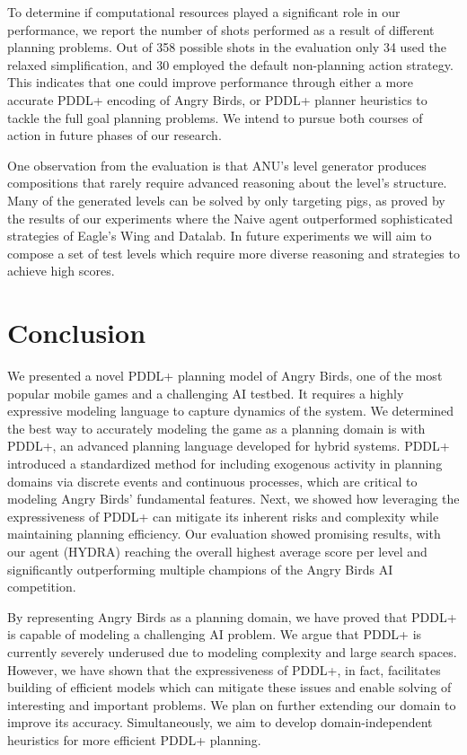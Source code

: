To determine if computational resources played a significant role in our performance, we report the number of shots performed as a result of different planning problems. Out of 358 possible shots in the evaluation only 34 used the relaxed simplification, and 30 employed the default non-planning action strategy. This indicates that one could improve performance through either a more accurate PDDL+ encoding of Angry Birds, or PDDL+ planner heuristics to tackle the full goal planning problems. We intend to pursue both courses of action in future phases of our research.

One observation from the evaluation is that ANU's level generator produces compositions that rarely require advanced reasoning about the level's structure. Many of the generated levels can be  solved by only targeting pigs, as proved by the results of our experiments where the Naive agent outperformed sophisticated strategies of Eagle's Wing and Datalab. In future experiments we will aim to compose a set of test levels which require more diverse reasoning and strategies to achieve high scores.

\section{Conclusion}

We presented a novel PDDL+ planning model of Angry Birds, one of the most popular mobile games and a challenging AI testbed. It requires a highly expressive modeling language to capture  dynamics of the system. We determined the best way to accurately modeling the game as a planning domain is with PDDL+, an advanced planning language developed for hybrid systems. PDDL+ introduced a standardized method for including exogenous activity in planning domains via discrete events and continuous processes, which are critical to modeling Angry Birds' fundamental features. Next, we showed how leveraging the expressiveness of PDDL+ can mitigate its inherent risks and complexity while maintaining planning efficiency. Our evaluation showed promising results, with our agent (HYDRA) reaching the overall highest average score per level and significantly outperforming multiple champions of the Angry Birds AI competition. 

By representing Angry Birds as a planning domain, we have proved that PDDL+ is capable of modeling a challenging AI problem. We argue that PDDL+ is currently severely underused due to modeling complexity and large search spaces. However, we have shown that the expressiveness of PDDL+, in fact, facilitates building of efficient models which can mitigate these issues and enable solving of interesting and important problems. We plan on further extending our domain to improve its accuracy. Simultaneously, we aim to develop domain-independent heuristics for more efficient PDDL+ planning.


\newpage
